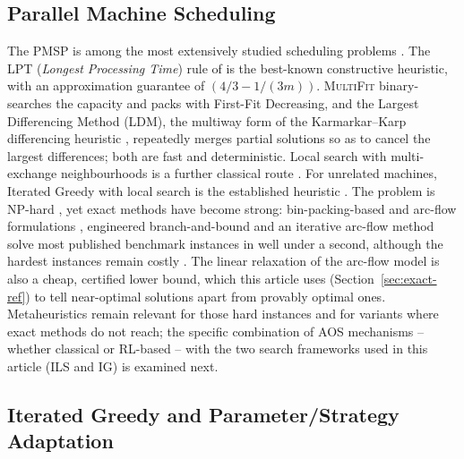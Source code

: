 \documentclass[final,3p,times,11pt,authoryear]{elsarticle}
\begin{document}
\subsection{Parallel Machine Scheduling}

The PMSP is among the most extensively studied scheduling problems
\citep{Pinedo2016}.
The LPT (\textit{Longest Processing Time}) rule of \citet{Graham1969}
is the best-known constructive heuristic, with an approximation
guarantee of $(4/3 - 1/(3m))$.
\textsc{MultiFit} \citep{CoffmanGareyJohnson1978} binary-searches the
capacity and packs with First-Fit Decreasing, and the Largest
Differencing Method (LDM), the multiway form of the Karmarkar--Karp
differencing heuristic \citep{KarmarkarKarp1983,MichielsEtal2007},
repeatedly merges partial solutions so as to cancel the largest
differences; both are fast and deterministic. Local search with
multi-exchange neighbourhoods is a further classical route
\citep{FrangioniEtal2004}.
For unrelated machines, Iterated Greedy with local search is the established
heuristic \citep{FanjulPeyroRuiz2010}.
The problem is NP-hard \citep{GareyJohnson1979}, yet exact methods
have become strong: bin-packing-based and arc-flow formulations
\citep{DellAmicoEtal2008,MradSouayah2018,GharbiBamatraf2022}, engineered
branch-and-bound \citep{AkramEtal2024} and an iterative arc-flow method
solve most published benchmark instances in well under a second,
although the hardest instances remain costly \citep{OstojicEtAl2025}.
The linear relaxation of the arc-flow model is also a cheap, certified
lower bound, which this article uses (Section~\ref{sec:exact-ref}) to
tell near-optimal solutions apart from provably optimal ones.
Metaheuristics remain
relevant for those hard instances and for variants where exact methods
do not reach; the specific combination of AOS
mechanisms -- whether classical or RL-based -- with the two search
frameworks used in this article (ILS and IG) is examined next.

\subsection{Iterated Greedy and Parameter/Strategy Adaptation}
\label{sec:ig-relwork}
\end{document}
